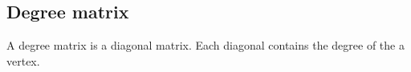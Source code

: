 
\subsection{Degree matrix}

A degree matrix is a diagonal matrix. Each diagonal contains the degree of the a vertex.

